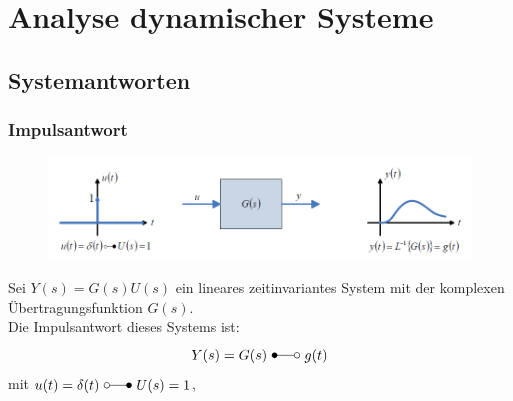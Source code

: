 \documentclass[10pt,a4paper]{article}
\begin{document}
\section{Analyse dynamischer Systeme}
\subsection{Systemantworten}
\subsubsection{Impulsantwort}
\begin{figure}[H]
	\includegraphics[width = \columnwidth]{imgs/impulsantwort.png}
\end{figure}
Sei $Y(s) = G(s) U(s)$ ein lineares zeitinvariantes System mit der komplexen Übertragungsfunktion $G(s)$. \\
Die Impulsantwort dieses Systems ist:
$$
	Y(s) = G(s) ~\Laplace ~g(t)
$$
mit $u(t) = \delta(t) ~\laplace ~U(s) = 1$,
\end{document}
